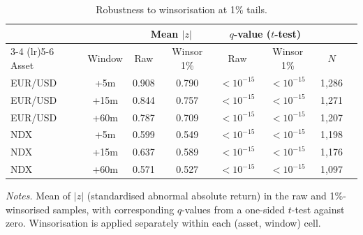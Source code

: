 \begin{table}[!htbp]
\centering
\caption{Robustness to winsorisation at 1\% tails.}
\label{tab:winsor}
\begin{threeparttable}
\small
\begin{tabular}{lccccccc}
\toprule
 & & \multicolumn{2}{c}{Mean $|z|$} & \multicolumn{2}{c}{$q$-value ($t$-test)} \\
\cmidrule(lr){3-4} \cmidrule(lr){5-6}
Asset & Window & Raw & Winsor 1\% & Raw & Winsor 1\% & $N$ \\
\midrule
EUR/USD & +5m & 0.908 & 0.790 & ${<}10^{-15}$ & ${<}10^{-15}$ & 1,286 \\
EUR/USD & +15m & 0.844 & 0.757 & ${<}10^{-15}$ & ${<}10^{-15}$ & 1,271 \\
EUR/USD & +60m & 0.787 & 0.709 & ${<}10^{-15}$ & ${<}10^{-15}$ & 1,207 \\
NDX & +5m & 0.599 & 0.549 & ${<}10^{-15}$ & ${<}10^{-15}$ & 1,198 \\
NDX & +15m & 0.637 & 0.589 & ${<}10^{-15}$ & ${<}10^{-15}$ & 1,176 \\
NDX & +60m & 0.571 & 0.527 & ${<}10^{-15}$ & ${<}10^{-15}$ & 1,097 \\
\bottomrule
\end{tabular}
\begin{tablenotes}
\footnotesize
\item \textit{Notes.} Mean of $|z|$ (standardised abnormal absolute
return) in the raw and 1\%-winsorised samples, with corresponding
$q$-values from a one-sided $t$-test against zero. Winsorisation
is applied separately within each (asset, window) cell.
\end{tablenotes}
\end{threeparttable}
\end{table}

